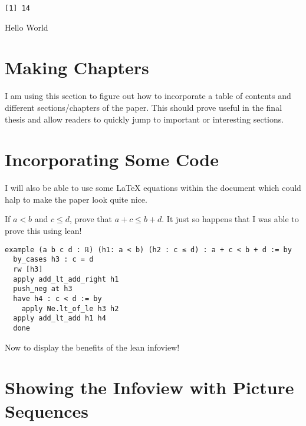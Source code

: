 \documentclass[
  letterpaper,
  DIV=11,
  numbers=noendperiod]{scrreprt}
\theoremstyle{remark}
\begin{document}
\begin{verbatim}
[1] 14
\end{verbatim}

Hello World

\hypertarget{making-chapters}{%
\section*{Making Chapters}\label{making-chapters}}


I am using this section to figure out how to incorporate a table of
contents and different sections/chapters of the paper. This should prove
useful in the final thesis and allow readers to quickly jump to
important or interesting sections.

\hypertarget{incorporating-some-code}{%
\section*{Incorporating Some Code}\label{incorporating-some-code}}


I will also be able to use some LaTeX equations within the document
which could halp to make the paper look quite nice.

If \(a < b\) and \(c \le d\), prove that \(a + c \le b + d\). It just so
happens that I was able to prove this using lean!

\begin{verbatim}
example (a b c d : ℝ) (h1: a < b) (h2 : c ≤ d) : a + c < b + d := by
  by_cases h3 : c = d
  rw [h3]
  apply add_lt_add_right h1
  push_neg at h3
  have h4 : c < d := by
    apply Ne.lt_of_le h3 h2
  apply add_lt_add h1 h4
  done
\end{verbatim}

Now to display the benefits of the lean infoview!

\hypertarget{showing-the-infoview-with-picture-sequences}{%
\section*{Showing the Infoview with Picture
Sequences}\label{showing-the-infoview-with-picture-sequences}}

\end{document}
